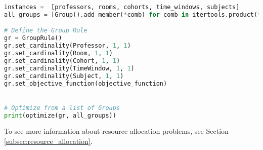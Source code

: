 \begin{lstlisting}[language=Python, caption={Creating and solving the Timetable Scheduling Problem using this framework.}, label={script:time_table}]
instances =  [professors, rooms, cohorts, time_windows, subjects]
all_groups = [Group().add_member(*comb) for comb in itertools.product(*instances)]

# Define the Group Rule
gr = GroupRule()
gr.set_cardinality(Professor, 1, 1)
gr.set_cardinality(Room, 1, 1)
gr.set_cardinality(Cohort, 1, 1)
gr.set_cardinality(TimeWindow, 1, 1)
gr.set_cardinality(Subject, 1, 1)
gr.set_objective_function(objective_function)


# Optimize from a list of Groups
print(optimize(gr, all_groups))
\end{lstlisting}

To see more information about resource allocation problems, see Section \ref{subsec:resource_allocation}.
